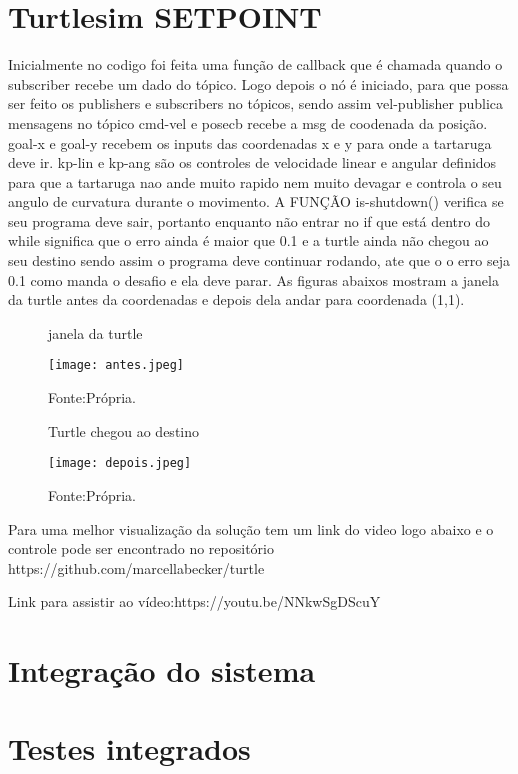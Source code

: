 \section{Turtlesim SETPOINT}
Inicialmente no codigo foi feita uma função de callback que é chamada quando o subscriber recebe um dado do tópico. 
Logo depois o nó é iniciado, para que possa ser feito os publishers e subscribers no tópicos, sendo assim 
vel-publisher publica mensagens no tópico cmd-vel e posecb recebe a msg de coodenada da posição.
goal-x e goal-y recebem os inputs das coordenadas x e y para onde a tartaruga deve ir. 
kp-lin e kp-ang são os controles de velocidade linear e angular definidos para que a tartaruga nao ande muito rapido nem
muito devagar e controla o seu angulo de curvatura durante o movimento.
A FUNÇÃO is-shutdown() verifica se seu programa deve sair, portanto enquanto não entrar no if que está dentro do while significa que o erro ainda é 
maior que 0.1 e a turtle ainda não chegou ao seu destino sendo assim o programa deve continuar rodando, ate que o o erro seja 0.1 como manda o desafio
e ela deve parar.
As figuras abaixos mostram a janela da turtle antes da coordenadas e depois dela andar para coordenada (1,1).
\begin{figure} [h!]	
    \centering
    \caption{janela da turtle}
    \texttt{[image: antes.jpeg]}
    \caption*{Fonte:Própria.}
    \label{fig:inicio}
\end{figure}
\begin{figure} [h!]	
    \centering
    \caption{Turtle chegou ao destino}
    \texttt{[image: depois.jpeg]}
    \caption*{Fonte:Própria.}
    \label{fig:fim}
\end{figure}
Para uma melhor visualização da solução tem um link do video 
logo abaixo e o controle pode ser encontrado no repositório https://github.com/marcellabecker/turtle  

Link para assistir ao vídeo:https://youtu.be/NNkwSgDScuY
\label{sec:testu}
\lipsum[1]

\section{Integração do sistema}
\label{sec:intsis}
\lipsum[1]

\section{Testes integrados}
\label{sec:testi}
\lipsum[1]







